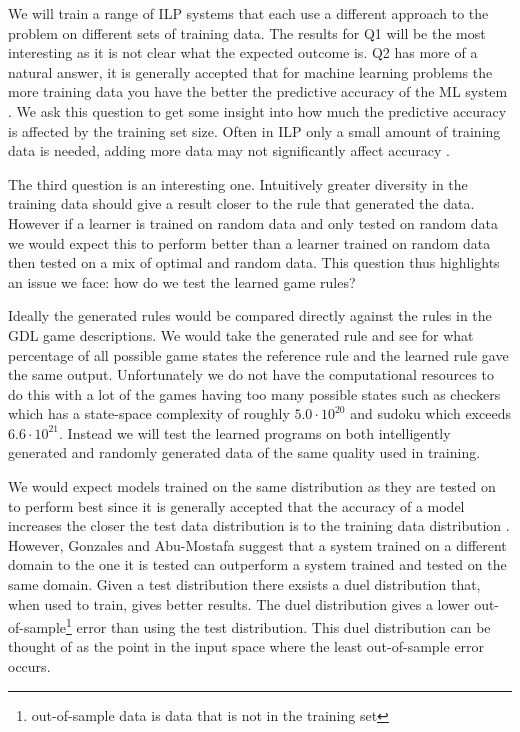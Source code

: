 We will train a range of ILP systems that each use a different approach to the problem on different sets of training data. The results for Q1 will be the most interesting as it is not clear what the expected outcome is. Q2 has more of a natural answer, it is generally accepted that for machine learning problems the more training data you have the better the predictive accuracy of the ML system \cite{Mitchell/MachineLearing}. We ask this question to get some insight into how much the predictive accuracy is affected by the training set size. Often in ILP only a small amount of training data is needed, adding more data may not significantly affect accuracy \cite{Muggleton/ILP}.

The third question is an interesting one. Intuitively greater diversity in the training data should give a result closer to the rule that generated the data. However if a learner is trained on random data and only tested on random data we would expect this to perform better than a learner trained on random data then tested on a mix of optimal and random data. This question thus highlights an issue we face: how do we test the learned game rules?

Ideally the generated rules would be compared directly against the rules in the GDL game descriptions. We would take the generated rule and see for what percentage of all possible game states the reference rule and the learned rule gave the same output. Unfortunately we do not have the computational resources to do this with a lot of the games having too many possible states such as checkers which has a state-space complexity of roughly $5.0 \cdot 10^{20}$\cite{Horssen/Checkers} and sudoku which exceeds $6.6 \cdot 10^{21}$\cite{Felgenhauer/Suduko}. Instead we will test the learned programs on both intelligently generated and randomly generated data of the same quality used in training.

We would expect models trained on the same distribution as they are tested on to perform best since it is generally accepted that the accuracy of a model increases the closer the test data distribution is to the training data distribution \cite{Mitchell/MachineLearing}. However, Gonzales and Abu-Mostafa\cite{Gonzalez/MismatchedOutperform} suggest that a system trained on a different domain to the one it is tested can outperform a system trained and tested on the same domain. Given a test distribution there exsists a duel distribution that, when used to train, gives better results. The duel distribution gives a lower out-of-sample\footnote{out-of-sample data is data that is not in the training set} error than using the test distribution. This duel distribution can be thought of as the point in the input space where the least out-of-sample error occurs\cite{Gonzalez/MismatchedOutperform}.

